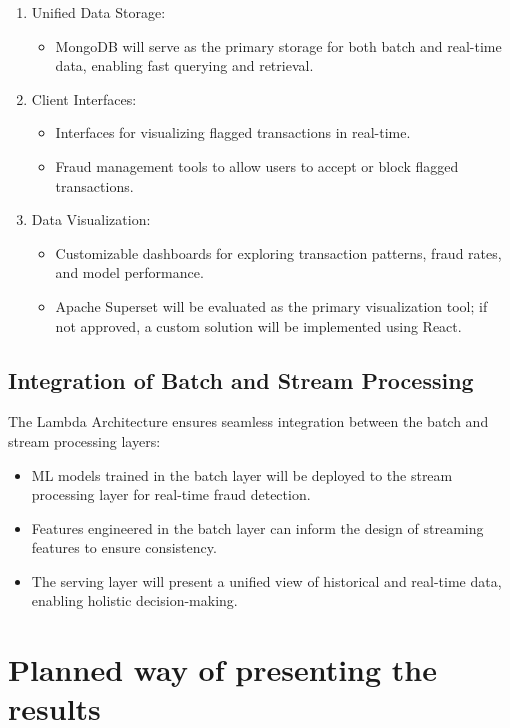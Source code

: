 \documentclass[12pt,a4paper, hidelinks]{article}
\begin{document}
\begin{enumerate}
    \item Unified Data Storage:
        \begin{itemize}
            \item MongoDB will serve as the primary storage for both batch and real-time data, enabling fast querying and retrieval.
        \end{itemize}
    \item Client Interfaces:
        \begin{itemize}
            \item Interfaces for visualizing flagged transactions in real-time.
            \item Fraud management tools to allow users to accept or block flagged transactions.
        \end{itemize}
    \item Data Visualization:
        \begin{itemize}
            \item Customizable dashboards for exploring transaction patterns, fraud rates, and model performance.
            \item Apache Superset will be evaluated as the primary visualization tool; if not approved, a custom solution will be implemented using React.
        \end{itemize}
\end{enumerate}

\subsection{Integration of Batch and Stream Processing}
The Lambda Architecture ensures seamless integration between the batch and stream processing layers:
\begin{itemize}
    \item ML models trained in the batch layer will be deployed to the stream processing layer for real-time fraud detection.
    \item Features engineered in the batch layer can inform the design of streaming features to ensure consistency.
    \item The serving layer will present a unified view of historical and real-time data, enabling holistic decision-making.
\end{itemize}

\section{Planned way of presenting the results}
\end{document}
